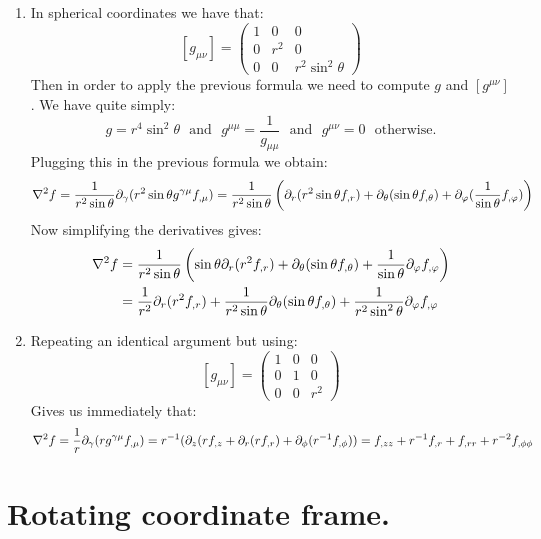 \documentclass[10pt,a4paper]{article}
\begin{document}
\begin{enumerate}
\item In spherical coordinates we have that:
\[
[g_{\mu \nu}] = \begin{pmatrix}
1 & 0 & 0\\
0 & r^2 & 0 \\
0 & 0 & r^2 \sin^2 \theta 
\end{pmatrix}
\]
Then in order to apply the previous formula we need to compute $g$ and $[g^{\mu \nu}]$. We have quite simply:
\[
g = r^4 \sin^2 \theta \mbox{~~and~~} g^{\mu \mu} = \frac{1}{g_{\mu \mu}} \mbox{~~and~~} g^{\mu \nu} = 0 \mbox{~~otherwise.}
\]
Plugging this in the previous formula we obtain:
\[
\laplacian f = \frac{1}{r^2 \sin \theta} \partial_\gamma(r^2 \sin\theta g^{\gamma \mu} f_{, \mu}) = \frac{1}{r^2 \sin \theta} \left( \partial_r (r^2 \sin \theta f_{,r}) + \partial_\theta (\sin \theta f_{, \theta}) + \partial_\varphi (\frac{1}{\sin \theta} f_{,\varphi}) \right)
\]
Now simplifying the derivatives gives:
\begin{align*}
\laplacian f &= \frac{1}{r^2 \sin \theta} \left( \sin \theta \partial_r (r^2 f_{,r}) + \partial_{\theta} (\sin \theta f_{, \theta}) + \frac{1}{\sin \theta} \partial_\varphi f_{,\varphi}  \right) \\
&= \frac{1}{r^2} \partial_r (r^2 f_{,r}) + \frac{1}{r^2 \sin \theta} \partial_\theta (\sin \theta f_{, \theta}) + \frac{1}{r^2 \sin^2 \theta}\partial_\varphi f_{,\varphi}
\end{align*}

\item Repeating an identical argument but using:
\[
[g_{\mu \nu}] = \begin{pmatrix}
1 & 0 & 0\\
0 & 1 & 0\\
0 & 0 & r^2
\end{pmatrix}
\]
Gives us immediately that:
\[
\laplacian f = \frac{1}{r} \partial_\gamma (r g^{\gamma \mu}f_{, \mu}) = r^{-1} ( \partial_z (r f_{,z} + \partial_{r} (r f_{,r}) + \partial_\phi (r^{-1} f_{,\phi})  ) = f_{,zz} + r^{-1} f_{,r} + f_{,rr} + r^{-2} f_{,\phi\phi}
\]
\end{enumerate}

\section{Rotating coordinate frame.}
\end{document}
